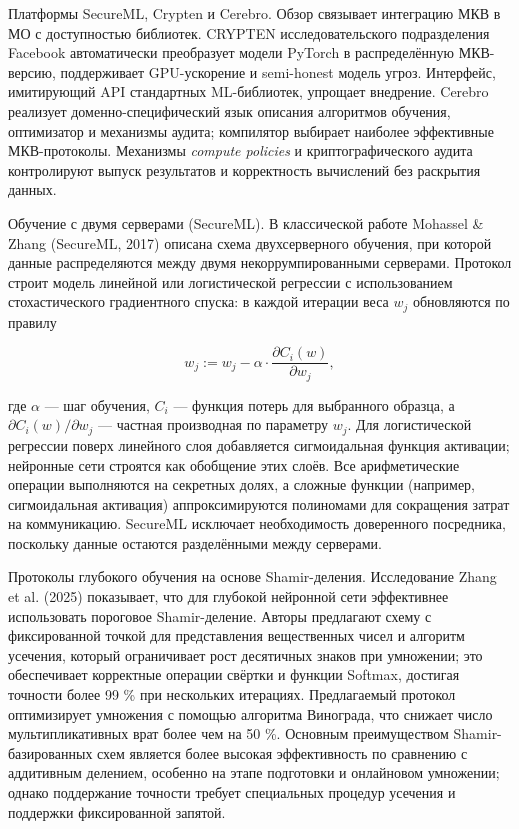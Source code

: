 Платформы SecureML, Crypten и Cerebro. Обзор \cite{07} связывает интеграцию МКВ в МО с доступностью библиотек. CRYPTEN исследовательского подразделения Facebook автоматически преобразует модели PyTorch в распределённую МКВ-\allowbreak версию, поддерживает GPU-\allowbreak ускорение и semi-\allowbreak honest модель угроз. Интерфейс, имитирующий API стандартных ML-библиотек, упрощает внедрение. Cerebro реализует доменно-специфический язык описания алгоритмов обучения, оптимизатор и механизмы аудита; компилятор выбирает наиболее эффективные МКВ-протоколы. Механизмы \textit{compute policies} и криптографического аудита контролируют выпуск результатов и корректность вычислений без раскрытия данных.

Обучение с двумя серверами (SecureML).  В классической работе Mohassel \& Zhang (SecureML, 2017) описана схема двухсерверного обучения, при которой данные распределяются между двумя некоррумпированными серверами.  Протокол строит модель линейной или логистической регрессии с использованием стохастического градиентного спуска: в каждой итерации веса \(w_j\) обновляются по правилу

\begin{equation}
w_j := w_j - \alpha \cdot \frac{\partial C_i(w)}{\partial w_j},
\end{equation}

где \(\alpha\) --- шаг обучения, \(C_i\) --- функция потерь для выбранного образца, а \(\partial C_i(w) / \partial w_j\) --- частная производная по параметру \(w_j\).  Для логистической регрессии поверх линейного слоя добавляется сигмоидальная функция активации; нейронные сети строятся как обобщение этих слоёв.  Все арифметические операции выполняются на секретных долях, а сложные функции (например, сигмоидальная активация) аппроксимируются полиномами для сокращения затрат на коммуникацию.  SecureML исключает необходимость доверенного посредника, поскольку данные остаются разделёнными между серверами.

Протоколы глубокого обучения на основе Shamir-\allowbreak деления.  Исследование Zhang et al. (2025) \cite{12} показывает, что для глубокой нейронной сети эффективнее использовать пороговое Shamir-деление.  Авторы предлагают схему с фиксированной точкой для представления вещественных чисел и алгоритм усечения, который ограничивает рост десятичных знаков при умножении; это обеспечивает корректные операции свёртки и функции Softmax, достигая точности более 99 \% при нескольких итерациях.  Предлагаемый протокол оптимизирует умножения с помощью алгоритма Винограда, что снижает число мультипликативных врат более чем на 50 \%.  Основным преимуществом Shamir-базированных схем является более высокая эффективность по сравнению с аддитивным делением, особенно на этапе подготовки и онлайновом умножении; однако поддержание точности требует специальных процедур усечения и поддержки фиксированной запятой.

